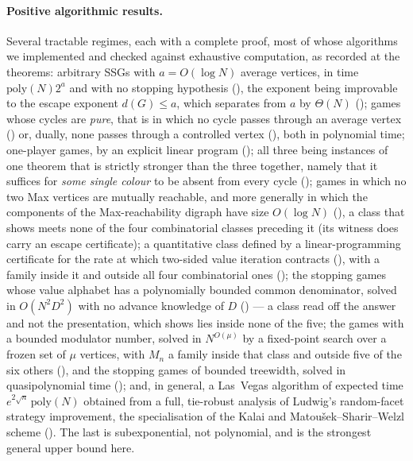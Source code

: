 \documentclass[11pt]{article}
\theoremstyle{plain}
\theoremstyle{definition}
\begin{document}
\paragraph{Positive algorithmic results.} Several tractable regimes, each
with a complete proof, most of whose algorithms we implemented and checked
against exhaustive computation, as recorded at the theorems:
arbitrary SSGs with $a=O(\log N)$ average vertices, in time
$\mathrm{poly}(N)2^{a}$ and with no stopping hypothesis
(), the exponent being improvable to the escape
exponent $d(G)\le a$, which  separates from $a$ by
$\Theta(N)$ (); games whose cycles are \emph{pure}, that is in which
no cycle passes through an average vertex () or,
dually, none passes through a controlled vertex
(), both in polynomial time; one-player games, by
an explicit linear program (); all three being
instances of one theorem that is strictly stronger than the three
together, namely that it suffices for \emph{some single colour} to be
absent from every cycle ();
games in which no two Max vertices are mutually reachable, and more
generally in which the components of the Max-reachability digraph have
size $O(\log N)$ (), a class that
 shows meets none of the four combinatorial classes
preceding it (its witness does carry an escape certificate); a quantitative
class defined by a linear-programming certificate for the rate at which
two-sided value iteration contracts (), with a
family inside it and outside all four combinatorial ones
(); the stopping games whose value alphabet has
a polynomially bounded common denominator, solved in $O(N^{2}D^{2})$ with
no advance knowledge of $D$ () --- a class read
off the answer and not the presentation, which 
shows lies inside none of the five; the games with a bounded
modulator number, solved in $N^{O(\mu)}$ by a fixed-point search over a
frozen set of $\mu$ vertices, with $M_n$ a family inside that class and
outside five of the six others (), and the
stopping games of bounded treewidth, solved in quasipolynomial time
(); and, in general, a
Las~Vegas algorithm of expected time $e^{2\sqrt n}\,\mathrm{poly}(N)$
obtained from a full, tie-robust analysis of Ludwig's random-facet
strategy improvement, the specialisation of the Kalai and
Matou\v{s}ek--Sharir--Welzl scheme
(). The last is
subexponential, not polynomial, and is the strongest general upper bound
here.
\end{document}
